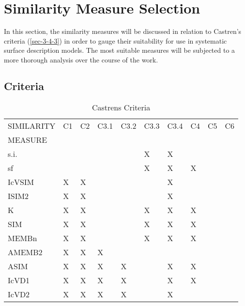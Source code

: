 \documentclass{article}
\begin{document}
\pagebreak
\section{Similarity Measure Selection}
\label{sec-6}

In this section, the similarity measures will be discussed in relation
to Castren's criteria (\ref{sec-3-4-3}) in order to gauge their
suitability for use in systematic surface description models. The most
suitable measures will be subjected to a more thorough analysis over
the course of the work.
\subsection{Criteria}
\label{sec-6-1}

\begin{table}[htb]
\caption{Castrens Criteria} 
\begin{center}
\begin{tabular}{llllllllll}
\hline
 SIMILARITY  &  C1  &  C2  &  C3.1  &  C3.2  &  C3.3  &  C3.4  &  C4  &  C5  &  C6  \\
 MEASURE     &      &      &        &        &        &        &      &      &      \\
\hline
 s.i.        &      &      &        &        &  X     &  X     &      &      &      \\
 sf          &      &      &        &        &  X     &  X     &  X   &      &      \\
 IcVSIM      &  X   &  X   &        &        &        &  X     &      &      &      \\
 ISIM2       &  X   &  X   &        &        &        &  X     &      &      &      \\
 K           &  X   &  X   &        &        &  X     &  X     &  X   &      &      \\
 SIM         &  X   &  X   &        &        &  X     &  X     &  X   &      &      \\
 MEMBn       &  X   &  X   &        &        &  X     &  X     &  X   &      &      \\
 AMEMB2      &  X   &  X   &  X     &        &        &        &      &      &      \\
 ASIM        &  X   &  X   &  X     &  X     &        &  X     &  X   &      &      \\
 IcVD1       &  X   &  X   &  X     &  X     &        &  X     &  X   &      &      \\
 IcVD2       &  X   &  X   &  X     &  X     &        &  X     &      &      &      \\

\end{tabular}
\end{center}
\end{table}
\end{document}
